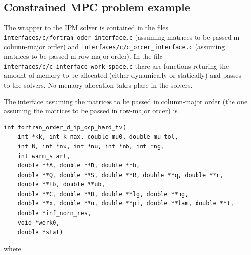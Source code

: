 \documentclass[a4paper]{report}
\begin{document}
\subsection{Constrained MPC problem example}

The wrapper to the IPM solver is contained in the files {\tt interfaces/c/fortran\_oder\_interface.c} (assuming matrices to be passed in column-major order) and {\tt interfaces/c/c\_order\_interface.c} (assuming matrices to be passed in row-major order).
In the file {\tt interfaces/c/c\_interface\_work\_space.c} there are functions returing the amount of memory to be allocated (either dynamically or statically) and passes to the solvers.
No memory allocation takes place in the solvers.

The interface assuming the matrices to be passed in column-major order (the one assuming the matrices to be passed in row-major order) is
\begin{verbatim}
int fortran_order_d_ip_ocp_hard_tv( 
    int *kk, int k_max, double mu0, double mu_tol,
    int N, int *nx, int *nu, int *nb, int *ng,
    int warm_start,
    double **A, double **B, double **b, 
    double **Q, double **S, double **R, double **q, double **r, 
    double **lb, double **ub,
    double **C, double **D, double **lg, double **ug,
    double **x, double **u, double **pi, double **lam, double **t,
    double *inf_norm_res,
    void *work0, 
    double *stat)
\end{verbatim}
where
\end{document}
